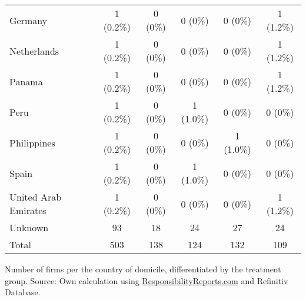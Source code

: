 \documentclass[12pt]{article}
\begin{document}
\begin{table}
\begin{tabular}{lccccc}
        Germany & 1 (0.2\%) & 0 (0\%) & 0 (0\%) & 0 (0\%) & 1 (1.2\%)\\
        Netherlands & 1 (0.2\%) & 0 (0\%) & 0 (0\%) & 0 (0\%) & 1 (1.2\%)\\
        Panama & 1 (0.2\%) & 0 (0\%) & 0 (0\%) & 0 (0\%) & 1 (1.2\%)\\
        Peru & 1 (0.2\%) & 0 (0\%) & 1 (1.0\%) & 0 (0\%) & 0 (0\%)\\
        Philippines & 1 (0.2\%) & 0 (0\%) & 0 (0\%) & 1 (1.0\%) & 0 (0\%)\\
        Spain & 1 (0.2\%) & 0 (0\%) & 1 (1.0\%) & 0 (0\%) & 0 (0\%)\\
        United Arab Emirates & 1 (0.2\%) & 0 (0\%) & 0 (0\%) & 0 (0\%) & 1 (1.2\%)\\
        Unknown & 93 & 18 & 24 & 27 & 24\\
        \midrule
        Total & 503 & 138 &  124 & 132 & 109 \\
        \bottomrule
    \end{tabular}

    \vspace{0.2cm}
    
    \begin{tablenotes}
        \footnotesize
        \item Number of firms per the country of domicile, differentiated by the treatment group. Source: Own calculation using \href{https://responsibilityreports.com}{ResponsibilityReports.com} and Refinitiv Database.
    \end{tablenotes}
    
    

\end{table}

\end{document}
